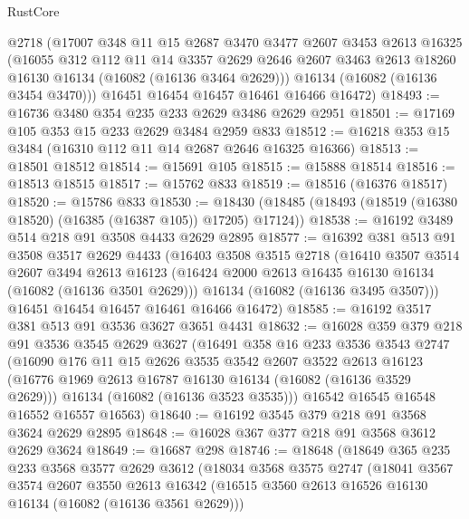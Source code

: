 \begin{lexlean}{RustCore}
\begin{coremodule}
      @2718
      (@17007
        @348
        @11
        @15
        @2687
        @3470
        @3477
        @2607
        @3453
        @2613
        @16325
        (@16055
          @312
          @112
          @11
          @14
          @3357
          @2629
          @2646
          @2607
          @3463
          @2613
          @18260
          @16130
          @16134
          (@16082 (@16136 @3464 @2629)))
        @16134
        (@16082 (@16136 @3454 @3470)))
      @16451
      @16454
      @16457
      @16461
      @16466
      @16472)
@18493 := @16736 @3480 @354 @235 @233 @2629 @3486 @2629 @2951
@18501 := @17169 @105 @353 @15 @233 @2629 @3484 @2959 @833
@18512 := @16218 @353 @15 @3484 (@16310 @112 @11 @14 @2687 @2646 @16325 @16366)
@18513 := @18501 @18512
@18514 := @15691 @105
@18515 := @15888 @18514
@18516 := @18513 @18515
@18517 := @15762 @833
@18519 := @18516 (@16376 @18517)
@18520 := @15786 @833
@18530 := @18430 (@18485 (@18493 (@18519 (@16380 @18520) (@16385 (@16387 @105)) @17205) @17124))
@18538 := @16192 @3489 @514 @218 @91 @3508 @4433 @2629 @2895
@18577 := @16392
    @381
    @513
    @91
    @3508
    @3517
    @2629
    @4433
    (@16403
      @3508
      @3515
      @2718
      (@16410
        @3507
        @3514
        @2607
        @3494
        @2613
        @16123
        (@16424 @2000 @2613 @16435 @16130 @16134 (@16082 (@16136 @3501 @2629)))
        @16134
        (@16082 (@16136 @3495 @3507)))
      @16451
      @16454
      @16457
      @16461
      @16466
      @16472)
@18585 := @16192 @3517 @381 @513 @91 @3536 @3627 @3651 @4431
@18632 := @16028
    @359
    @379
    @218
    @91
    @3536
    @3545
    @2629
    @3627
    (@16491
      @358
      @16
      @233
      @3536
      @3543
      @2747
      (@16090
        @176
        @11
        @15
        @2626
        @3535
        @3542
        @2607
        @3522
        @2613
        @16123
        (@16776 @1969 @2613 @16787 @16130 @16134 (@16082 (@16136 @3529 @2629)))
        @16134
        (@16082 (@16136 @3523 @3535)))
      @16542
      @16545
      @16548
      @16552
      @16557
      @16563)
@18640 := @16192 @3545 @379 @218 @91 @3568 @3624 @2629 @2895
@18648 := @16028 @367 @377 @218 @91 @3568 @3612 @2629 @3624
@18649 := @16687 @298
@18746 := @18648
    (@18649
      @365
      @235
      @233
      @3568
      @3577
      @2629
      @3612
      (@18034
        @3568
        @3575
        @2747
        (@18041
          @3567
          @3574
          @2607
          @3550
          @2613
          @16342
          (@16515 @3560 @2613 @16526 @16130 @16134 (@16082 (@16136 @3561 @2629)))

\end{coremodule}
\end{lexlean}
